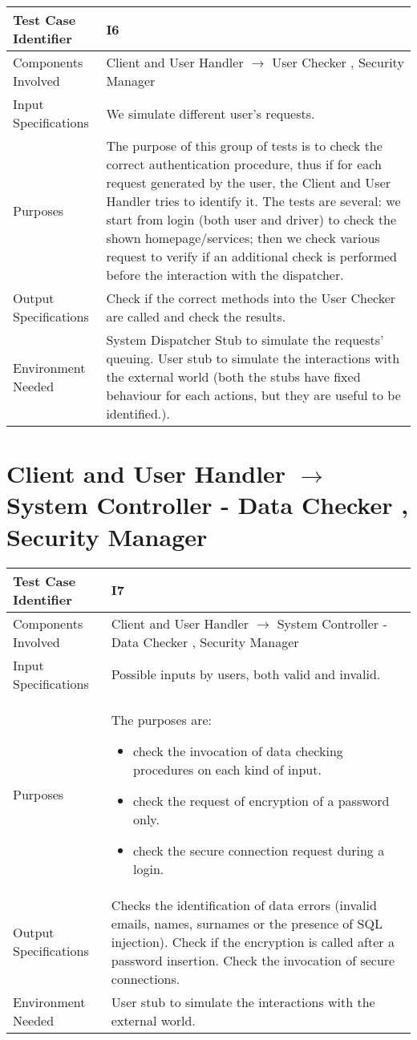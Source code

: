 \documentclass[\mainpath/main]{subfiles}
\begin{document}
\begin{tabular}[!ht]{l@{\hspace{1cm}}p{8.5cm}}
	\hline  Test Case Identifier & I6\\ 
	\hline  Components Involved & Client and User Handler $\rightarrow$ User Checker , Security Manager\\ 
	\hline  Input Specifications & We simulate different user's requests.\\ 
	\hline  Purposes & The purpose of this group of tests is to check the correct authentication procedure, thus if for each request generated by the user, the Client and User Handler tries to identify it. The tests are several: we start from login (both user and driver) to check the shown homepage/services; then we check various request to verify if an additional check is performed before the interaction with the dispatcher.\\
	\hline  Output Specifications & Check if the correct methods into the User Checker are called and check the results.\\ 
	\hline  Environment Needed & System Dispatcher Stub to simulate the requests' queuing. User stub to simulate the interactions with the external world (both the stubs have fixed behaviour for each actions, but they are useful to be identified.). \\ 
	\hline 
\end{tabular} 

\section{Client and User Handler $\rightarrow$ System Controller - Data Checker , Security Manager}

\begin{tabular}[!ht]{l@{\hspace{1cm}}p{8.5cm}}
	\hline  Test Case Identifier & I7\\ 
	\hline  Components Involved & Client and User Handler $\rightarrow$ System Controller - Data Checker , Security Manager\\ 
	\hline  Input Specifications & Possible inputs by users, both valid and invalid.\\ 
	\hline  Purposes & The purposes are:
									\begin{itemize}
										\item check the invocation of data checking procedures on each kind of input.
										\item check the request of encryption of a password only.
										\item check the secure connection request during a login.
									\end{itemize}\\ 
	\hline  Output Specifications & Checks the identification of data errors (invalid emails, names, surnames or the presence of SQL injection). Check if the encryption is called after a password insertion. Check the invocation of secure connections.\\ 
	\hline  Environment Needed & User stub to simulate the interactions with the external world.\\ 
	\hline 
\end{tabular}
\end{document}
